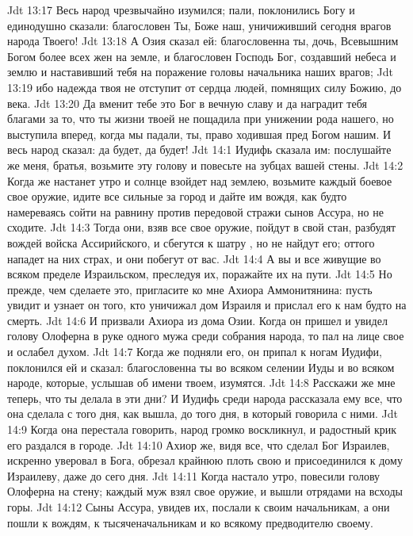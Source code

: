 \vs Jdt 13:17 Весь народ чрезвычайно изумился; пали, поклонились Богу и единодушно сказали: благословен Ты, Боже наш, уничиживший сегодня врагов народа Твоего!
\vs Jdt 13:18 А Озия сказал ей: благословенна ты, дочь, Всевышним Богом более всех жен на земле, и благословен Господь Бог, создавший небеса и землю и наставивший тебя на поражение головы начальника наших врагов;
\vs Jdt 13:19 ибо надежда твоя не отступит от сердца людей, помнящих силу Божию, до века.
\vs Jdt 13:20 Да вменит тебе это Бог в вечную славу и да наградит тебя благами за то, что ты жизни твоей не пощадила при унижении рода нашего, но выступила вперед, когда мы падали, ты, право ходившая пред Богом нашим. И весь народ сказал: да будет, да будет!
\vs Jdt 14:1 Иудифь сказала им: послушайте же меня, братья, возьмите эту голову и повесьте на зубцах вашей стены.
\vs Jdt 14:2 Когда же настанет утро и солнце взойдет над землею, возьмите каждый боевое свое оружие, идите все сильные за город и дайте им вождя, как будто намереваясь сойти на равнину против передовой стражи сынов Ассура, но не сходите.
\vs Jdt 14:3 Тогда они, взяв все свое оружие, пойдут в свой стан, разбудят вождей войска Ассирийского, и сбегутся к шатру , но не найдут его; оттого нападет на них страх, и они побегут от вас.
\vs Jdt 14:4 А вы и все живущие во всяком пределе Израильском, преследуя их, поражайте их на пути.
\vs Jdt 14:5 Но прежде, чем сделаете это, пригласите ко мне Ахиора Аммонитянина: пусть увидит и узнает он того, кто уничижал дом Израиля и прислал его к нам будто на смерть.
\rsbpar\vs Jdt 14:6 И призвали Ахиора из дома Озии. Когда он пришел и увидел голову Олоферна в руке одного мужа среди собрания народа, то пал на лице свое и ослабел духом.
\vs Jdt 14:7 Когда же подняли его, он припал к ногам Иудифи, поклонился ей и сказал: благословенна ты во всяком селении Иуды и во всяком народе, которые, услышав об имени твоем, изумятся.
\vs Jdt 14:8 Расскажи же мне теперь, что ты делала в эти дни? И Иудифь среди народа рассказала ему все, что она сделала с того дня, как вышла, до того дня, в который говорила с ними.
\vs Jdt 14:9 Когда она перестала говорить, народ громко воскликнул, и радостный крик его раздался в городе.
\vs Jdt 14:10 Ахиор же, видя все, что сделал Бог Израилев, искренно уверовал в Бога, обрезал крайнюю плоть свою и присоединился к дому Израилеву, даже до сего дня.
\rsbpar\vs Jdt 14:11 Когда настало утро, повесили голову Олоферна на стену; каждый муж взял свое оружие, и вышли отрядами на всходы горы.
\vs Jdt 14:12 Сыны Ассура, увидев их, послали к своим начальникам, а они пошли к вождям, к тысяченачальникам и ко всякому предводителю своему.
